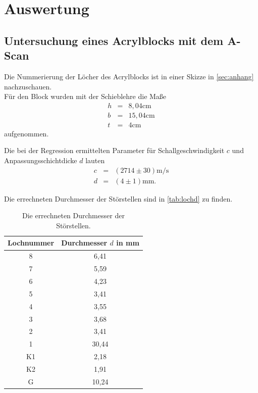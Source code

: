 \section{Auswertung}
\label{sec:Auswertung}

\subsection{Untersuchung eines Acrylblocks mit dem A-Scan}
Die Nummerierung der Löcher des Acrylblocks ist in einer Skizze in \autoref{sec:anhang} nachzuschauen.\\
Für den Block wurden mit der Schieblehre die Maße
\begin{eqnarray}
    h &=& 8,04 \mathrm{cm} \nonumber \\
    b &=& 15,04 \mathrm{cm} \nonumber \\
    t &=& 4 \mathrm{cm} \nonumber 
\end{eqnarray}
aufgenommen.

Die bei der Regression ermittelten Parameter für Schallgeschwindigkeit $c$ und Anpassungsschichtdicke $d$ lauten
\begin{eqnarray}
    c &=& (2714 \pm 30) \mathrm{m/s} \nonumber \\
    d &=& (4 \pm 1 )\mathrm{mm.} \nonumber 
\end{eqnarray}

Die errechneten Durchmesser der Störstellen sind in \autoref{tab:lochd} zu finden.\\

\begin{table}[h]
    \centering
    \caption{Die errechneten Durchmesser der Störstellen.}
    \begin{tabular}{cc}
      \toprule
      {Lochnummer} & 
      {Durchmesser $d$ in mm }\\
      \midrule
      8  &  6,41    \\
      7  &  5,59    \\
      6  &  4,23    \\
      5  &  3,41    \\
      4  &  3,55    \\
      3  &  3,68    \\
      2  &  3,41    \\
      1  &  30,44   \\
      K1 &  2,18    \\
      K2 &  1,91    \\   
      G  &  10,24   \\
      \bottomrule
    \end{tabular}
    \label{tab:lochd}
  \end{table}
\noindent


